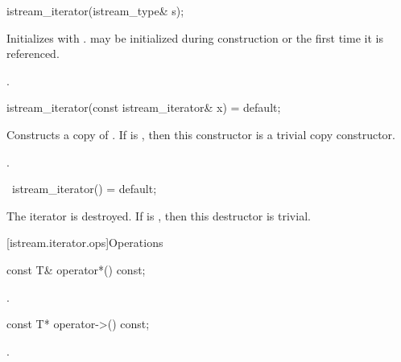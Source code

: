 %
\begin{itemdecl}
istream_iterator(istream_type& s);
\end{itemdecl}

\begin{itemdescr}
\pnum
\effects
Initializes  with .
 may be initialized during
construction or the first time it is referenced.

\pnum
\ensures {}.
\end{itemdescr}


%
\begin{itemdecl}
istream_iterator(const istream_iterator& x) = default;
\end{itemdecl}

\begin{itemdescr}
\pnum
\effects
Constructs a copy of .
If  is ,
then this constructor is a trivial copy constructor.

\pnum
\ensures {}.
\end{itemdescr}

%
\begin{itemdecl}
~istream_iterator() = default;
\end{itemdecl}

\begin{itemdescr}
\pnum
\effects
The iterator is destroyed.
If  is ,
then this destructor is trivial.
\end{itemdescr}

[istream.iterator.ops]{Operations}

%
\begin{itemdecl}
const T& operator*() const;
\end{itemdecl}

\begin{itemdescr}
\pnum
\returns
{}.
\end{itemdescr}

%
\begin{itemdecl}
const T* operator->() const;
\end{itemdecl}

\begin{itemdescr}
\pnum
\returns
{}.
\end{itemdescr}

